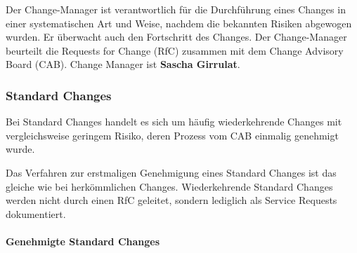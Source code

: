 \documentclass[]{article}
\let\oldparagraph\paragraph
\renewcommand{\paragraph}[1]{\oldparagraph{#1}\mbox{}}
\begin{document}
Der Change-Manager ist verantwortlich für die Durchführung eines Changes
in einer systematischen Art und Weise, nachdem die bekannten Risiken
abgewogen wurden. Er überwacht auch den Fortschritt des Changes. Der
Change-Manager beurteilt die Requests for Change (RfC) zusammen mit dem
Change Advisory Board (CAB). Change Manager ist \textbf{Sascha
Girrulat}.

\subsubsection{Standard Changes}\label{standard-changes}

Bei Standard Changes handelt es sich um häufig wiederkehrende Changes
mit vergleichsweise geringem Risiko, deren Prozess vom CAB einmalig
genehmigt wurde.

Das Verfahren zur erstmaligen Genehmigung eines Standard Changes ist das
gleiche wie bei herkömmlichen Changes. Wiederkehrende Standard Changes
werden nicht durch einen RfC geleitet, sondern lediglich als Service
Requests dokumentiert.

\paragraph{Genehmigte Standard Changes}\label{genehmigte-standard-changes}
\end{document}
